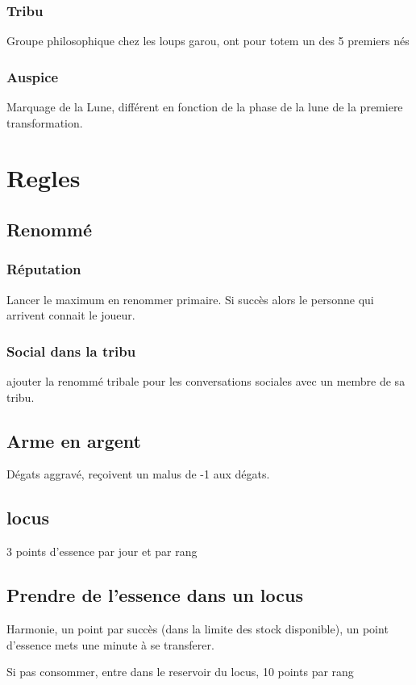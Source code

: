 \documentclass[oneside,12pt]{book}
\begin{document}
\begin{flushleft}
\subsection{Tribu}
Groupe philosophique chez les loups garou, ont pour totem un des 5 premiers nés


\subsection{Auspice}
Marquage de la Lune, différent en fonction de la phase de la lune de la premiere transformation. 




\chapter{Regles}
\section{Renommé}
\subsection{Réputation}
Lancer le maximum en renommer primaire. Si succès alors le personne qui arrivent connait le joueur.

\subsection{Social dans la tribu}
ajouter la renommé tribale pour les conversations sociales avec un membre de sa tribu. 


\section{Arme en argent}
Dégats aggravé, reçoivent un malus de -1 aux dégats. 

\section{locus}
3 points d'essence par jour et par rang

\section{Prendre de l'essence dans un locus}
Harmonie, un point par succès (dans la limite des stock disponible), un point d'essence mets une minute à se transferer. 

Si pas consommer, entre dans le reservoir du locus, 10 points par rang



\end{flushleft}
\end{document}
